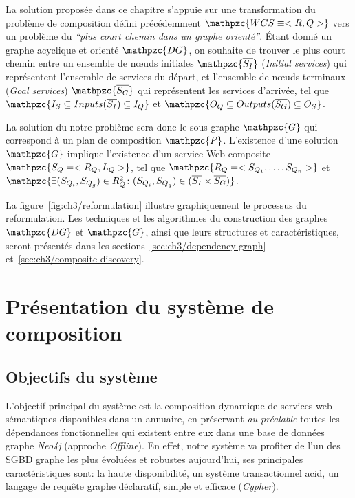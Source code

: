 La solution proposée dans ce chapitre s'appuie sur une transformation
du problème de composition défini précédemment
$\mathpzc{WCS \equiv <R,Q>}$ vers un problème du \textit{``plus court
  chemin dans un graphe orienté''}. Étant donné un graphe acyclique et
orienté $\mathpzc{DG}$, on souhaite de trouver le plus court chemin
entre un ensemble de nœuds initiales $\mathpzc{\overline{S_I}}$
(\emph{Initial services}) qui représentent l'ensemble de services du
départ, et l'ensemble de nœuds terminaux (\emph{Goal services})
$\mathpzc{\overline{S_G}}$ qui représentent les services d'arrivée,
tel que $\mathpzc{I_S \subseteq Inputs(\overline{S_I}) \subseteq I_Q}$
et
$\mathpzc{O_Q \subseteq Outputs(\overline{S_G}) \subseteq
  O_S}$.\medskip

La solution du notre problème sera donc le sous-graphe $\mathpzc{G}$
qui correspond à un plan de composition $\mathpzc{P}$. L'existence
d'une solution $\mathpzc{G}$ implique l'existence d'un service Web
composite $\mathpzc{S_Q= <R_Q, L_Q>}$, tel que
$\mathpzc{R_Q= <S_{Q_1}, \dots, S_{Q_n}>}$ et
$\mathpzc{\exists (S_{Q_i},S_{Q_g}) \in R_Q^2 \colon (S_{Q_i},S_{Q_g})
  \in (\overline{S_I} \times \overline{S_G})}$.\medskip

La figure~\ref{fig:ch3/reformulation} illustre graphiquement le
processus du reformulation. Les techniques et les algorithmes du
construction des graphes $\mathpzc{DG}$ et $\mathpzc{G}$, ainsi que
leurs structures et caractéristiques, seront présentés dans les
sections~\ref{sec:ch3/dependency-graph}
et~\ref{sec:ch3/composite-discovery}.\medskip

\section{Présentation  du système de composition}
\label{sec:ch3/presentation}

\subsection{Objectifs du système}
\label{sec:ch3/presentation-goals}

L'objectif principal du système est la composition dynamique de
services web sémantiques disponibles dans un annuaire, en préservant
\emph{au préalable} toutes les dépendances fonctionnelles qui existent
entre eux dans une base de données graphe \emph{Neo4j} (approche
\emph{Offline}). En effet, notre système va profiter de l'un des
\acrshort{SGBD} graphe les plus évoluées et robustes aujourd'hui, ses
principales caractéristiques sont: la haute disponibilité, un système
transactionnel \acrshort{acid}, un langage de requête graphe
déclaratif, simple et efficace (\emph{Cypher}).\medskip

